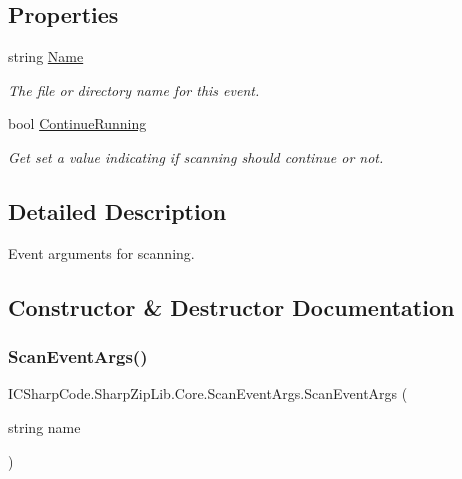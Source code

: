 \subsection*{Properties}
\begin{DoxyCompactItemize}
\item 
string \hyperlink{class_i_c_sharp_code_1_1_sharp_zip_lib_1_1_core_1_1_scan_event_args_ab164cd9634a636803875d14d280cf27d}{Name}
\begin{DoxyCompactList}\small\item\em The file or directory name for this event. \end{DoxyCompactList}\item 
bool \hyperlink{class_i_c_sharp_code_1_1_sharp_zip_lib_1_1_core_1_1_scan_event_args_af809f91a43356acb99ba57cfeafa6aea}{Continue\+Running}
\begin{DoxyCompactList}\small\item\em Get set a value indicating if scanning should continue or not. \end{DoxyCompactList}\end{DoxyCompactItemize}


\subsection{Detailed Description}
Event arguments for scanning. 



\subsection{Constructor \& Destructor Documentation}
\mbox{\label{class_i_c_sharp_code_1_1_sharp_zip_lib_1_1_core_1_1_scan_event_args_ae40108e29389873745c46f21b1f6187a}} 
\subsubsection{\texorpdfstring{Scan\+Event\+Args()}{ScanEventArgs()}}
{\footnotesize\ttfamily I\+C\+Sharp\+Code.\+Sharp\+Zip\+Lib.\+Core.\+Scan\+Event\+Args.\+Scan\+Event\+Args (\begin{DoxyParamCaption}\item[{string}]{name }\end{DoxyParamCaption})\hspace{0.3cm}{\ttfamily [inline]}}



